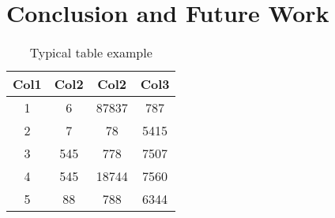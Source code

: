 \chapter{Conclusion and Future Work}
\label{ch:conclusion}

\begin{table}[h!]
	\centering
	\begin{tabular}{||c c c c||}
    \hline
    Col1 & Col2 & Col2 & Col3 \\ [0.5ex] 
    \hline\hline
    1 & 6 & 87837 & 787 \\ 
    2 & 7 & 78 & 5415 \\
    3 & 545 & 778 & 7507 \\
    4 & 545 & 18744 & 7560 \\
    5 & 88 & 788 & 6344 \\ [1ex]
    \hline
    \end{tabular}
	\caption{Typical table example}
	\label{table:1}
\end{table}
